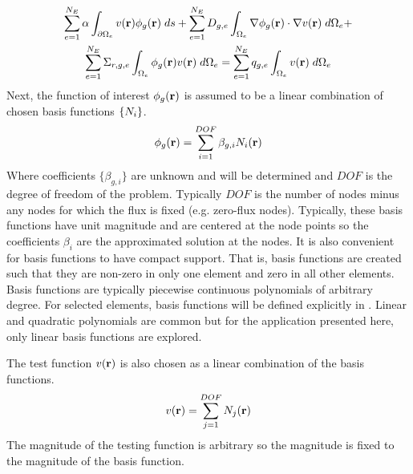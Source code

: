     \begin{multline} \label{eq:element_boundary}
      \sum_{e=1}^{N_E} \alpha \int_{\partial \Omega_e} v(\mathbf{r}) 
        \phi_g(\mathbf{r}) \;ds + \sum_{e=1}^{N_E} D_{g,e}
        \int_{\Omega_e} \mathbf{\nabla} \phi_g(\mathbf{r}) \cdot \mathbf{\nabla} v(\mathbf{r}) \; d\Omega_e + \\
        \sum_{e=1}^{N_E} \Sigma_{r,g,e} \int_{\Omega_e} \phi_g(\mathbf{r}) v(\mathbf{r}) 
        \; d\Omega_e =
        \sum_{e=1}^{N_E} q_{g,e} \int_{\Omega_e} v(\mathbf{r}) \; d\Omega_e
    \end{multline}
    Next, the function of interest $\phi_g(\mathbf{r})$ is assumed to be a linear 
    combination of chosen basis functions $\{N_i\}$.
    \begin{equation} \label{eq:linear_combination}
      \phi_g(\mathbf{r}) = \sum_{i=1}^{DOF} \beta_{g,i} N_i(\mathbf{r})
    \end{equation}
    Where coefficients $\{\beta_{g,i}\}$ are unknown and will be determined and $DOF$
    is the degree of freedom of the problem. Typically $DOF$ is the number of
    nodes minus any nodes for which the flux is fixed (e.g. zero-flux nodes).
    Typically, these basis functions have unit magnitude and are centered at the
    node  points so the coefficients $\beta_i$ are the approximated solution at
    the nodes. It is also convenient for basis functions to have compact
    support. That is, basis functions are created such that they are non-zero in
    only one element and zero in all other elements.
    Basis functions are typically piecewise continuous polynomials of arbitrary 
    degree. For selected elements, basis functions will be defined explicitly in
    .
    Linear and quadratic polynomials are common but for the application 
    presented here, only linear basis functions are explored.

    The test function $v(\mathbf{r})$ is also chosen as a linear combination of the 
    basis functions.
    \begin{equation} \label{eq:linear_superposition}
      v(\mathbf{r}) = \sum_{j=1}^{DOF} N_j(\mathbf{r})
    \end{equation}
    The magnitude of the testing function is arbitrary so the magnitude is fixed
    to the magnitude of the basis function.
    
